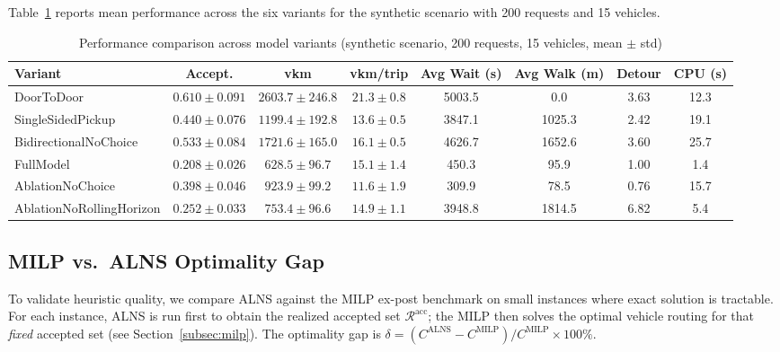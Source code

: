 Table~\ref{tab:main-results} reports mean performance across the six variants
for the synthetic scenario with 200 requests and 15 vehicles.

\begin{table}[h]
\centering
\caption{Performance comparison across model variants (synthetic scenario, 200 requests, 15 vehicles, mean $\pm$ std)}
\label{tab:main-results}
\begin{tabular}{lccccccc}
\toprule
Variant & Accept. & vkm & vkm/trip & Avg Wait (s) & Avg Walk (m) & Detour & CPU (s) \\
\midrule
DoorToDoor               & $0.610 \pm 0.091$ & $2603.7 \pm 246.8$ & $21.3 \pm 0.8$ & 5003.5 & 0.0    & 3.63 & 12.3 \\
SingleSidedPickup        & $0.440 \pm 0.076$ & $1199.4 \pm 192.8$ & $13.6 \pm 0.5$ & 3847.1 & 1025.3 & 2.42 & 19.1 \\
BidirectionalNoChoice    & $0.533 \pm 0.084$ & $1721.6 \pm 165.0$ & $16.1 \pm 0.5$ & 4626.7 & 1652.6 & 3.60 & 25.7 \\
FullModel                & $0.208 \pm 0.026$ & $628.5 \pm 96.7$   & $15.1 \pm 1.4$ & 450.3  & 95.9   & 1.00 & 1.4  \\
AblationNoChoice         & $0.398 \pm 0.046$ & $923.9 \pm 99.2$   & $11.6 \pm 1.9$ & 309.9  & 78.5   & 0.76 & 15.7 \\
AblationNoRollingHorizon & $0.252 \pm 0.033$ & $753.4 \pm 96.6$   & $14.9 \pm 1.1$ & 3948.8 & 1814.5 & 6.82 & 5.4  \\
\bottomrule
\end{tabular}
\end{table}

\subsection{MILP vs.\ ALNS Optimality Gap}\label{subsec:milp-gap}

To validate heuristic quality, we compare ALNS against the MILP ex-post
benchmark on small instances where exact solution is tractable.
For each instance, ALNS is run first to obtain the realized accepted set
$\mathcal{R}^{\text{acc}}$; the MILP then solves the optimal vehicle routing
for that \emph{fixed} accepted set (see Section~\ref{subsec:milp}).
The optimality gap is $\delta = (C^{\text{ALNS}} - C^{\text{MILP}}) /
C^{\text{MILP}} \times 100\%$.


